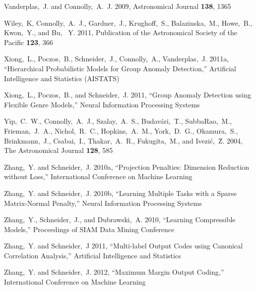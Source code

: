 \documentclass[useAMS,usenatbib,tightenlines,11pt,preprint]{aastex}
\begin{document}
\begin{thebibliography}{99}
Vanderplas,~J. and Connolly,~A.~J. 2009,
Astronomical Journal {\bf 138}, 1365

Wiley,~K, Connolly,~A.~J., Gardner,~J., Krughoff,~S., Balazinska,~M., Howe,~B.,
Kwon,~Y., and Bu, ~Y. 2011, Publication of the Astronomical Society of the
Pacific {\bf 123}, 366

Xiong,~L., Poczos,~B., Schneider,~J., Connolly,~A., Vanderplas,~J. 2011a,
``Hierarchical Probabilistic Models for Group Anomaly Detection,''
Artificial Intelligence and Statistics (AISTATS)

Xiong,~L., Poczos,~B., and Schneider,~J. 2011, ``Group Anomaly Detection using Flexible
Genre Models,'' Neural Information Processing Systems

Yip,~C.~W., Connolly,~A.~J., Szalay,~A.~S., Budav\'ari,~T., SubbaRao,~M.,
Frieman,~J.~A., Nichol,~R.~C., Hopkins,~A.~M., York,~D.~G., Okamura,~S.,
Brinkmann,~J., Csabai,~I., Thakar,~A.~R., Fukugita,~M., 
and Ivezi\'c,~\u Z. 2004, The Astronomical Journal {\bf 128}, 585

Zhang,~Y. and Schneider,~J. 2010a, ``Projection Penalties: Dimension Reduction without
Loss,'' International Conference on Machine Learning

Zhang,~Y. and Schneider,~J. 2010b,
``Learning Multiple Tasks with a Sparse Matrix-Normal Penalty,''
Neural Information Processing Systems

Zhang,~Y., Schneider,~J., and Dubrawski,~A. 2010,
``Learning Compressible Models,'' Proceedings of SIAM Data Mining Conference

Zhang,~Y. and Schneider,~J 2011, ``Multi-label Output Codes using Canonical Correlation
Analysis,'' Artificial Intelligence and Statistics

Zhang,~Y. and Schneider,~J. 2012, ``Maximum Margin Output Coding,''
International Conference on Machine Learning

\end{thebibliography} 
\label{lastpage}
\end{document}
